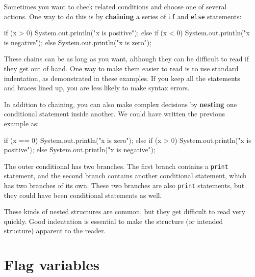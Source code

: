 \documentclass[12pt]{book}
\theoremstyle{exercise}
\newcommand{\java}[1]{\verb"#1"}
\begin{document}

Sometimes you want to check related conditions and choose one of several actions.
One way to do this is by {\bf chaining} a series of \java{if} and \java{else} statements:

\begin{code}
    if (x > 0) {
        System.out.println("x is positive");
    } else if (x < 0) {
        System.out.println("x is negative");
    } else {
        System.out.println("x is zero");
    }
\end{code}


These chains can be as long as you want, although they can be difficult to read if they get out of hand.
One way to make them easier to read is to use standard indentation, as demonstrated in these examples.
If you keep all the statements and braces lined up, you are less likely to make syntax errors.


In addition to chaining, you can also make complex decisions by {\bf nesting} one conditional statement inside another.
We could have written the previous example as:

\begin{code}
    if (x == 0) {
        System.out.println("x is zero");
    } else {
        if (x > 0) {
            System.out.println("x is positive");
        } else {
            System.out.println("x is negative");
        }
    }
\end{code}

The outer conditional has two branches.
The first branch contains a \java{print} statement, and the second branch contains another conditional statement, which has two branches of its own.
These two branches are also \java{print} statements, but they could have been conditional statements as well.

These kinds of nested structures are common, but they get difficult to read very quickly.
Good indentation is essential to make the structure (or intended structure) apparent to the reader.


\section{Flag variables}
\end{document}
